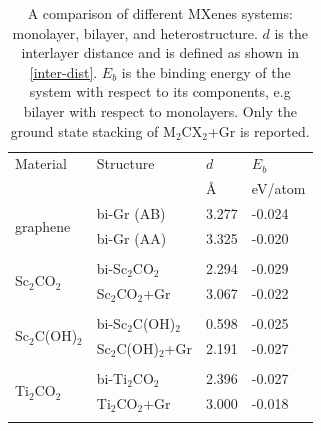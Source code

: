 \begin{table}[htb]
\centering
\caption{A comparison of different MXenes systems: monolayer, bilayer, and heterostructure. $d$ is the interlayer distance and is defined as shown in \autoref{inter-dist}. $E_b$ is the binding energy of the system with respect to its components, e.g bilayer with respect to monolayers. Only the ground state stacking of M$_2$CX$_2$+Gr is reported.} 
\label{tableI}
\begin{tabularx}{0.8\linewidth}{XXXX}
\hline
Material      & Structure                         & $d$               & $E_b$               \\
              &                                    & \AA                & eV/atom \\ \hline
\multirow{2}{*}{graphene}      & bi-Gr (AB)                                               & 3.277                    & -0.024                        \\
              & bi-Gr (AA)                                                & 3.325                    & -0.020                         \\ \multicolumn{4}{c}{}\\
\multirow{2}{*}{Sc$_2$CO$_2$}    & bi-Sc$_2$CO$_2$                                                   & 2.294                 & -0.029                         \\
              & Sc$_2$CO$_2$+Gr                                                   & 3.067                   & -0.022                         \\
\multicolumn{4}{c}{}\\              
\multirow{2}{*}{Sc$_2$C(OH)$_2$} & bi-Sc$_2$C(OH)$_2$                                                   & 0.598                  & -0.025                         \\
              & Sc$_2$C(OH)$_2$+Gr                                                     & 2.191                  & -0.027                         \\
\multicolumn{4}{c}{}\\              
\multirow{2}{*}{Ti$_2$CO$_2$}    & bi-Ti$_2$CO$_2$                                                & 2.396                   & -0.027                         \\
              & Ti$_2$CO$_2$+Gr                                                   & 3.000                    & -0.018                         \\
\multicolumn{4}{c}{}\\              

\end{tabularx}
\end{table}
